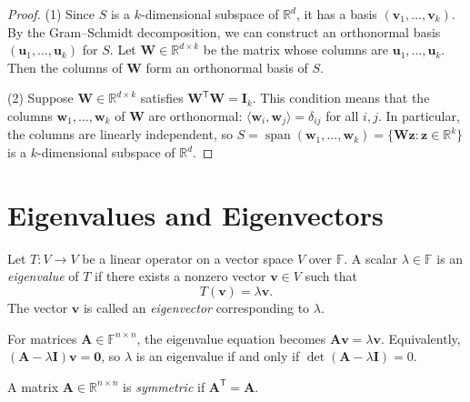 \begin{proof}
  (1) Since $S$ is a $k$-dimensional subspace of $\mathbb{R}^d$, it has a basis $(\mathbf{v}_1,\dots,\mathbf{v}_k)$.
  By the Gram--Schmidt decomposition, we can construct an orthonormal basis $(\mathbf{u}_1,\dots,\mathbf{u}_k)$ for $S$.
  Let $\mathbf{W} \in \mathbb{R}^{d \times k}$ be the matrix whose columns are $\mathbf{u}_1,\dots,\mathbf{u}_k$.
  Then the columns of $\mathbf{W}$ form an orthonormal basis of $S$.

  (2) Suppose $\mathbf{W} \in \mathbb{R}^{d \times k}$ satisfies $\mathbf{W}^{\mathsf{T}}\mathbf{W} = \mathbf{I}_k$.
  This condition means that the columns $\mathbf{w}_1,\dots,\mathbf{w}_k$ of $\mathbf{W}$ are orthonormal:
  $\langle \mathbf{w}_i, \mathbf{w}_j \rangle = \delta_{ij}$ for all $i,j$.
  In particular, the columns are linearly independent, so $S = \operatorname{span}(\mathbf{w}_1,\dots,\mathbf{w}_k) = \{\mathbf{W}\mathbf{z} : \mathbf{z} \in \mathbb{R}^k\}$
  is a $k$-dimensional subspace of $\mathbb{R}^d$.
\end{proof}

\section{Eigenvalues and Eigenvectors}

\begin{definition}
  Let $T : V \to V$ be a linear operator on a vector space $V$ over $\mathbb{F}$.
  A scalar $\lambda \in \mathbb{F}$ is an \emph{eigenvalue} of $T$ if there exists a nonzero vector $\mathbf{v} \in V$ such that
  \begin{equation}
    T(\mathbf{v}) = \lambda \mathbf{v}.
  \end{equation}
  The vector $\mathbf{v}$ is called an \emph{eigenvector} corresponding to $\lambda$.
\end{definition}

\begin{remark}
  For matrices $\mathbf{A} \in \mathbb{F}^{n \times n}$, the eigenvalue equation becomes $\mathbf{A}\mathbf{v} = \lambda \mathbf{v}$.
  Equivalently, $(\mathbf{A} - \lambda \mathbf{I})\mathbf{v} = \mathbf{0}$, so $\lambda$ is an eigenvalue if and only if
  $\det(\mathbf{A} - \lambda \mathbf{I}) = 0$.
\end{remark}

\begin{definition}
  A matrix $\mathbf{A} \in \mathbb{R}^{n \times n}$ is \emph{symmetric} if $\mathbf{A}^{\mathsf{T}} = \mathbf{A}$.
\end{definition}

